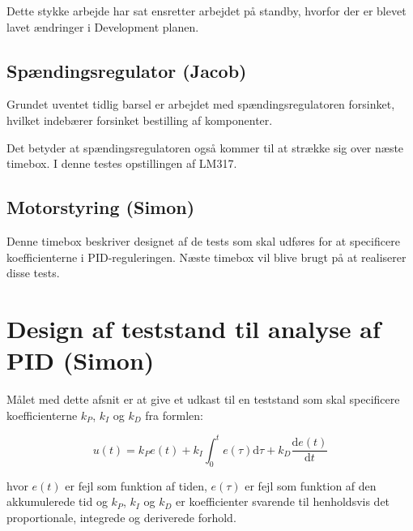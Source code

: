 Dette stykke arbejde har sat ensretter arbejdet på standby, hvorfor der er blevet lavet ændringer i Development planen.

\subsection{Spændingsregulator (Jacob)}
\label{sec:spand-jacob}
Grundet uventet tidlig barsel er arbejdet med spændingsregulatoren forsinket, hvilket indebærer forsinket bestilling af komponenter.

Det betyder at spændingsregulatoren også kommer til at strække sig over næste timebox. I denne testes opstillingen af LM317.

\subsection{Motorstyring (Simon)}
\label{sec:motorstyring-simon}
Denne timebox beskriver designet af de tests som skal udføres for at specificere koefficienterne i PID-reguleringen. Næste timebox vil blive brugt på at realiserer disse tests.


\section{Design af teststand til analyse af PID (Simon)}
\label{sec:design-af-teststand}

Målet med dette afsnit er at give et udkast til en teststand som skal specificere koefficienterne $k_P$, $k_I$ og $k_D$ fra formlen:

\begin{equation}
  \label{eq:1}
  u(t)=k_Pe(t)+k_I \int_0^t e(\tau)\mathrm{d}\tau + k_D\frac{\mathrm{d}e(t)}{\mathrm{d}t}
\end{equation}

hvor $e(t)$ er fejl som funktion af tiden, $e(\tau)$ er fejl som funktion af den akkumulerede tid og $k_P$, $k_I$ og $k_D$ er koefficienter svarende til henholdsvis det proportionale, integrede og deriverede forhold.

